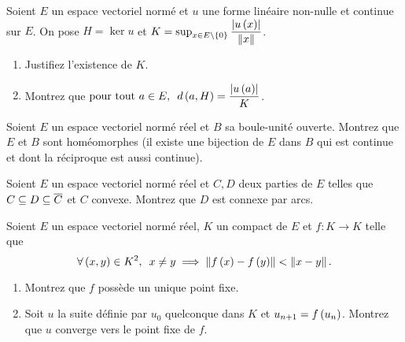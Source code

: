 \begin{corr}
\end{corr}

\begin{exosss}[Exercice 33]
Soient \(E\) un espace vectoriel normé et \(u\) une forme linéaire non-nulle et continue sur \(E\). On pose \(H=\ker u\) et \(K=\sup_{x\in E\setminus\left\lbrace0\right\rbrace}\dfrac{\left\lvert u\left(x\right)\right\rvert}{\left\|x\right\|}\).

\begin{enumerate}
    \item Justifiez l'existence de \(K\). \\
    \item Montrez que \(\quantifs{\tpt a\in E}d\paren{a,H}=\dfrac{\abs{u\paren{a}}}{K}\).
\end{enumerate}
\end{exosss}

\begin{corr}
\end{corr}

\begin{exo}
Soient \(E\) un espace vectoriel normé réel et \(B\) sa boule-unité ouverte. Montrez que \(E\) et \(B\) sont homéomorphes (\ie il existe une bijection de \(E\) dans \(B\) qui est continue et dont la réciproque est aussi continue).
\end{exo}

\begin{corr}
\end{corr}

\begin{exo}
Soient \(E\) un espace vectoriel normé réel et \(C,D\) deux parties de \(E\) telles que \(C\subseteq D\subseteq\overline{C}\) et \(C\) convexe. Montrez que \(D\) est connexe par arcs.
\end{exo}

\begin{corr}
\end{corr}

\begin{exo}
Soient \(E\) un espace vectoriel normé réel, \(K\) un compact de \(E\) et \(f:K\to K\) telle que \[\quantifs{\forall\paren{x,y}\in K^2}x\not=y\imp\norme{f\paren{x}-f\paren{y}}<\norme{x-y}.\]

\begin{enumerate}
    \item Montrez que \(f\) possède un unique point fixe. \\
    \item Soit \(u\) la suite définie par \(u_0\) quelconque dans \(K\) et \(u_{n+1}=f\left(u_n\right)\). Montrez que \(u\) converge vers le point fixe de \(f\).
\end{enumerate}
\end{exo}

